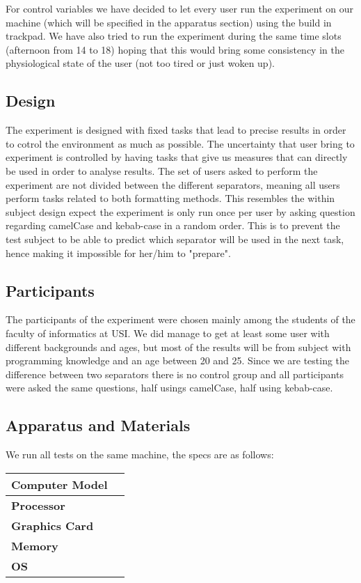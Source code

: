 \documentclass{article}
\begin{document}
For control variables we have decided to let every user run the experiment on our machine (which will be specified in the apparatus section) using 
the build in trackpad. We have also tried to run the experiment during the same time slots (afternoon from 14 to 18) hoping that this would 
bring some consistency in the physiological state of the user (not too tired or just woken up).

\subsection{Design}
The experiment is designed with fixed tasks that lead to precise results in order to cotrol the environment as much as possible. The uncertainty that 
user bring to experiment is controlled by having tasks that give us measures that can directly be used in order to analyse results. The set of users asked to 
perform the experiment are not divided between the different separators, meaning all users perform tasks related to both formatting methods. This resembles the 
within subject design expect the experiment is only run once per user by asking question regarding camelCase and kebab-case in a random order. This is to prevent 
the test subject to be able to predict which separator will be used in the next task, hence making it impossible for her/him to "prepare".

\subsection{Participants}
The participants of the experiment were chosen mainly among the students of the faculty of informatics at USI. We did manage to get at least some user 
with different backgrounds and ages, but most of the results will be from subject with programming knowledge and an age between 20 and 25. Since we are testing the difference 
between two separators there is no control group and all participants were asked the same questions, half usings camelCase, half using kebab-case.

\subsection{Apparatus and Materials}
We run all tests on the same machine, the specs are as follows:
\label{apparatus}
\begin{center}
	\begin{tabular}{ll}
		\hline
		\hline
		\textbf{Computer Model} &  \\
		\hline
		\textbf{Processor}      &  \\
		\textbf{Graphics Card}  &  \\
		\textbf{Memory}         &  \\
		\textbf{OS}             &  \\
		\hline
		\hline
	\end{tabular}
\end{center}
\end{document}

